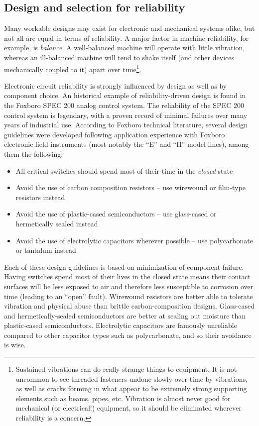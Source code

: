 \filbreak
\subsection{Design and selection for reliability}

Many workable designs may exist for electronic and mechanical systems alike, but not all are equal in terms of reliability.  A major factor in machine reliability, for example, is \textit{balance}.  A well-balanced machine will operate with little vibration, whereas an ill-balanced machine will tend to shake itself (and other devices mechanically coupled to it) apart over time\footnote{Sustained vibrations can do really strange things to equipment.  It is not uncommon to see threaded fasteners undone slowly over time by vibrations, as well as cracks forming in what appear to be extremely strong supporting elements such as beams, pipes, etc.  Vibration is almost never good for mechanical (or electrical!) equipment, so it should be eliminated wherever reliability is a concern.}.

Electronic circuit reliability is strongly influenced by design as well as by component choice.  An historical example of reliability-driven design is found in the Foxboro SPEC 200 analog control system.  The reliability of the SPEC 200 control system is legendary, with a proven record of minimal failures over many years of industrial use.  According to Foxboro technical literature, several design guidelines were developed following application experience with Foxboro electronic field instruments (most notably the ``E'' and ``H'' model lines), among them the following:    

\begin{itemize}
\item All critical switches should spend most of their time in the \textit{closed} state
\item Avoid the use of carbon composition resistors -- use wirewound or film-type resistors instead
\item Avoid the use of plastic-cased semiconductors -- use glass-cased or hermetically sealed instead
\item Avoid the use of electrolytic capacitors wherever possible -- use polycarbonate or tantalum instead
\end{itemize}

Each of these design guidelines is based on minimization of component failure.  Having switches spend most of their lives in the closed state means their contact surfaces will be less exposed to air and therefore less susceptible to corrosion over time (leading to an ``open'' fault).  Wirewound resistors are better able to tolerate vibration and physical abuse than brittle carbon-composition designs.  Glass-cased and hermetically-sealed semiconductors are better at sealing out moisture than plastic-cased semiconductors.  Electrolytic capacitors are famously unreliable compared to other capacitor types such as polycarbonate, and so their avoidance is wise.

